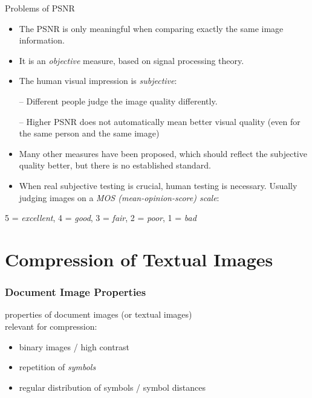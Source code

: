 \documentclass{beamer}
\begin{document}
\begin{frame}{Problems of PSNR}
\begin{itemize}
\item The PSNR is only meaningful when comparing exactly the same image information.
\item It is an \textit{objective} measure, based on signal processing theory. 
\item The human visual impression is \textit{subjective}: 

-- Different people judge the image quality differently. 

-- Higher PSNR does not automatically mean better visual quality (even for the same person and the same image)

\item Many other measures have been proposed, which should reflect the subjective quality better, 
but there is no established standard. 

\item When real subjective testing is crucial, human testing is necessary. 
Usually judging images on a \textit{MOS (mean-opinion-score) scale}: 
\end{itemize}
\begin{center}
5 = \textit{excellent}, 
4 = \textit{good}, 
3 = \textit{fair}, 
2 = \textit{poor}, 
1 = \textit{bad}
\end{center}
\end{frame}

\section{Compression of Textual Images}

%
%
%
%

\begin{frame}
  \frametitle{Document Image Properties}

properties of document images (or textual images) \\ relevant for compression:
\begin{itemize}
\item binary images / high contrast
\item repetition of {\em symbols}
\item regular distribution of symbols / symbol distances
\end{itemize}


\end{frame}
\end{document}
